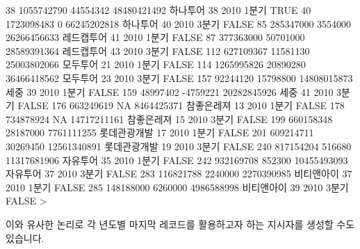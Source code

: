 \documentclass[tutorial.tex]{subfiles}
\begin{document}
\begin{Schunk}
\begin{Soutput}
38  1055742790   44554342 48480421492     하나투어   38 2010 1분기  TRUE
40  1723098483          0 66245202818     하나투어   40 2010 3분기 FALSE
85   285347000    3554000 26266456633   레드캡투어   41 2010 1분기 FALSE
87   377363000   50701000 28589391364   레드캡투어   43 2010 3분기 FALSE
112  627109367   11581130 25003802066     모두투어   21 2010 1분기 FALSE
114 1265995826   20890280 36466418562     모두투어   23 2010 3분기 FALSE
157   92244120   15798800 14808015873         세중   39 2010 1분기 FALSE
159   48997402   -4759221 20282845926         세중   41 2010 3분기 FALSE
176  663249619         NA  8464425371   참좋은레져   13 2010 1분기 FALSE
178  734878924         NA 14717211161   참좋은레져   15 2010 3분기 FALSE
199  660158348   28187000  7761111255 롯데관광개발   17 2010 1분기 FALSE
201  609214711   30269450 12561340891 롯데관광개발   19 2010 3분기 FALSE
240  817154204     516680 11317681906     자유투어   35 2010 1분기 FALSE
242  932169708     852300 10455493093     자유투어   37 2010 3분기 FALSE
283  116821788    2240000  2270390985   비티앤아이   37 2010 1분기 FALSE
285  148188000    6260000  4986588998   비티앤아이   39 2010 3분기 FALSE
> 
\end{Soutput}
\end{Schunk}

이와 유사한 논리로 각 년도별 마지막 레코드를 활용하고자 하는 지시자를 생성할 수도 있습니다. 
\end{document}
